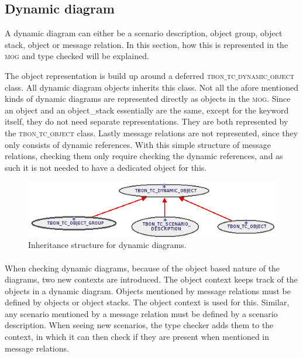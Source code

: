 \subsection{Dynamic diagram}
A dynamic diagram can either be a scenario description, object group, object stack, object or message relation. In this section, how this is represented in the \textsc{mog} and type checked will be explained.

The object representation is build up around a deferred \textsc{tbon$\_$tc$\_$dynamic$\_$object} class. All dynamic diagram objects inherits this class. Not all the afore mentioned kinds of dynamic diagrams are represented directly as objects in the \textsc{mog}. Since an object and an object\_stack essentially are the same, except for the keyword itself, they do not need separate representations. They are both represented by the \textsc{tbon$\_$tc$\_$object} class. Lastly message relations are not represented, since they only consists of dynamic references. With this simple structure of message relations, checking them only require checking the dynamic references, and as such it is not needed to have a dedicated object for this.

\begin{figure}[h]
\centerline{
\includegraphics[scale=0.7]{images/dynamic-diagram.png}
}
\caption{Inheritance structure for dynamic diagrams.}
\label{fig:dynamic-diagram}
\end{figure}

\paragraph{}
When checking dynamic diagrams, because of the object based nature of the diagrams, two new contexts are introduced. The object context keeps track of the objects in a dynamic diagram. Objects mentioned by message relations must be defined by objects or object stacks. The object context is used for this. Similar, any scenario mentioned by a message relation must be defined by a scenario description. When seeing new scenarios, the type checker adds them to the context, in which it can then check if they are present when mentioned in message relations.

